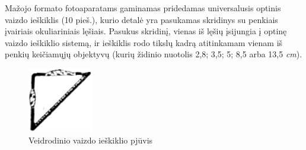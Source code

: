 \documentclass[12pt]{book}
\begin{document}
					Mažojo formato fotoaparatams gaminamas pridedamas universalusis optinis vaizdo ieškiklis (10 pieš.), kurio detalė yra pasukamas skridinys su penkiais įvairiais okuliariniais lęšiais.
					Pasukus skridinį, vienas iš lęšių įsijungia į optinę vaizdo ieškiklio sistemą, ir ieškiklis rodo tikslų kadrą atitinkamam vienam iš penkių keičiamųjų objektyvų (kurių židinio nuotolis 2,8; 3,5; 5; 8,5 arba 13,5 \textit{cm}).
					\begin{figure}
						\centering
						\includegraphics[width=0.25\textwidth]{11-pav}
						\caption{Veidrodinio vaizdo ieškiklio pjūvis}
						\label{fig:11}
					\end{figure}
\end{document}
